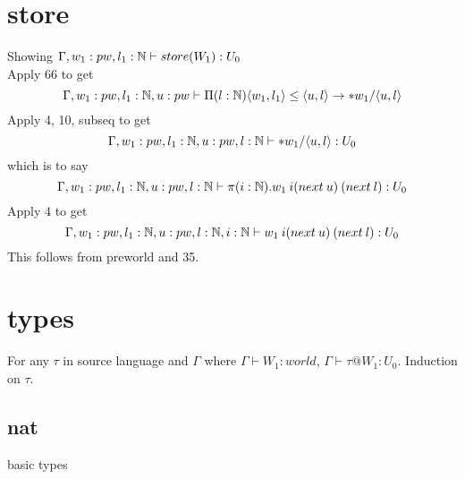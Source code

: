 \documentclass{article}
\begin{document}
     




\section*{store}
Showing $\Gamma, w_1: pw, l_1: \mathbb{N} \vdash store(W_1) : U_0$\\
Apply 66 to get
\[\Gamma, w_1: pw, l_1 : \mathbb{N}, u: pw \vdash
\Pi(l : \mathbb{N})\langle w_1, l_1 \rangle \leq \langle u, l \rangle \rightarrow *w_1/\langle u, l \rangle
\]
Apply 4, 10, subseq to get
\[\Gamma, w_1: pw, l_1 : \mathbb{N}, u: pw, l : \mathbb{N} \vdash
*w_1/\langle u, l \rangle : U_0
\]
which is to say 
\[\Gamma, w_1: pw, l_1 : \mathbb{N}, u: pw, l : \mathbb{N} \vdash
\pi(i: \mathbb{N}). w_1 \: i (next \: u) \: (next\: l) : U_0
\]
Apply 4 to get
\[\Gamma, w_1: pw, l_1 : \mathbb{N}, u: pw, l : \mathbb{N}, i: \mathbb{N} \vdash
 w_1 \: i (next \: u) \: (next\: l) : U_0
\]
This follows from preworld and 35.


\section*{types}
For any $\tau$ in source language and $\Gamma$ where $\Gamma \vdash W_1 : world$, $\Gamma \vdash \tau@W_1 : U_0$. Induction on $\tau$.
\subsection{nat}
basic types
\end{document}
